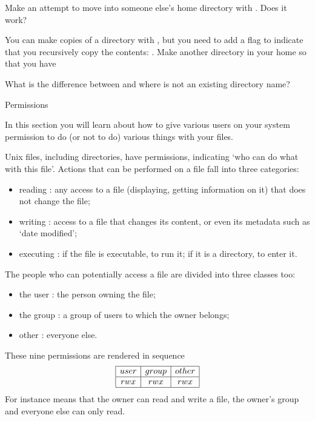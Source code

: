 Make an attempt to move into someone else's home directory with
. Does it work?

You can make copies of a directory with , but you need to add a
flag to indicate that you recursively copy the contents: . Make another directory  in your home so that you have


What is the difference between  and  where  is not an
existing directory name?

 {Permissions}

\begin{purpose}
  In this section you will learn about how to give various users on
  your system permission to do (or not to do) various things with your
  files.
\end{purpose}

Unix files, including directories,
have permissions, indicating `who can do what with this
file'. Actions that can be performed on a file fall into three
categories:
\begin{itemize}
\item reading : any access to a file (displaying, getting information
  on it) that does not change the file;
\item writing : access to a file that changes its content, or even its
  metadata such as `date modified';
\item executing : if the file is executable, to run it; if it is a
  directory, to enter it.
\end{itemize}
The people who can potentially access a file are divided into three
classes too:
\begin{itemize}
\item the user : the person owning the file;
\item the group : a group of users to which the owner belongs;
\item other : everyone else.
\end{itemize}
These nine permissions are rendered in sequence
\[ \begin{array}{|c|c|c|}
  \hline user&group&other\\ \hline rwx&rwx&rwx \\ \hline
\end{array}
\]
For instance
 means that the owner can read and write a file, the owner's
group and everyone else can only read. 

